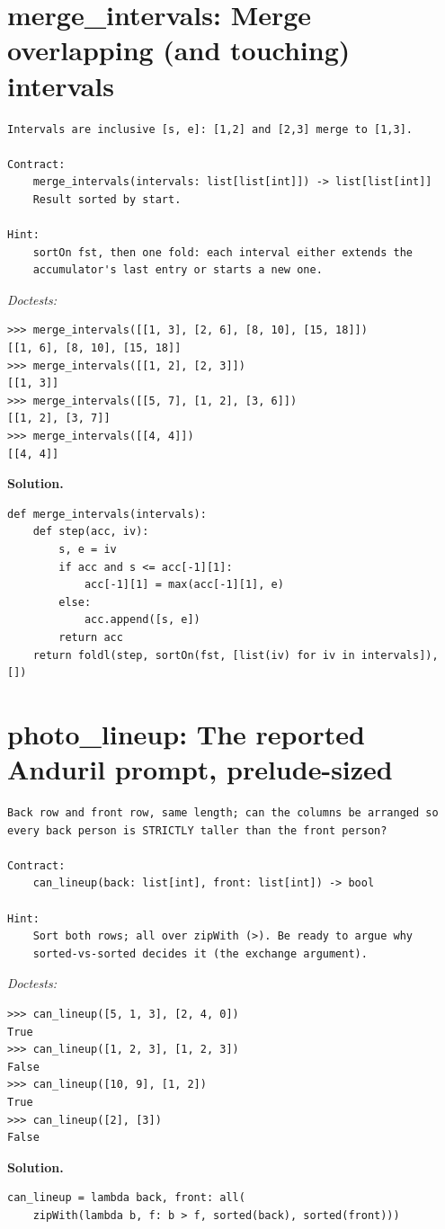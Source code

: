 \documentclass[11pt,letterpaper]{book}
\begin{document}
\section{merge\_intervals: Merge overlapping (and touching) intervals}
\begin{lstlisting}[style=spec]
Intervals are inclusive [s, e]: [1,2] and [2,3] merge to [1,3].

Contract:
    merge_intervals(intervals: list[list[int]]) -> list[list[int]]
    Result sorted by start.

Hint:
    sortOn fst, then one fold: each interval either extends the
    accumulator's last entry or starts a new one.
\end{lstlisting}
\noindent\textit{Doctests:}
\begin{lstlisting}[style=spec]
>>> merge_intervals([[1, 3], [2, 6], [8, 10], [15, 18]])
[[1, 6], [8, 10], [15, 18]]
>>> merge_intervals([[1, 2], [2, 3]])
[[1, 3]]
>>> merge_intervals([[5, 7], [1, 2], [3, 6]])
[[1, 2], [3, 7]]
>>> merge_intervals([[4, 4]])
[[4, 4]]
\end{lstlisting}
\noindent\textbf{Solution.}
\begin{lstlisting}[style=code]
def merge_intervals(intervals):
    def step(acc, iv):
        s, e = iv
        if acc and s <= acc[-1][1]:
            acc[-1][1] = max(acc[-1][1], e)
        else:
            acc.append([s, e])
        return acc
    return foldl(step, sortOn(fst, [list(iv) for iv in intervals]), [])
\end{lstlisting}

\section{photo\_lineup: The reported Anduril prompt, prelude-sized}
\begin{lstlisting}[style=spec]
Back row and front row, same length; can the columns be arranged so
every back person is STRICTLY taller than the front person?

Contract:
    can_lineup(back: list[int], front: list[int]) -> bool

Hint:
    Sort both rows; all over zipWith (>). Be ready to argue why
    sorted-vs-sorted decides it (the exchange argument).
\end{lstlisting}
\noindent\textit{Doctests:}
\begin{lstlisting}[style=spec]
>>> can_lineup([5, 1, 3], [2, 4, 0])
True
>>> can_lineup([1, 2, 3], [1, 2, 3])
False
>>> can_lineup([10, 9], [1, 2])
True
>>> can_lineup([2], [3])
False
\end{lstlisting}
\noindent\textbf{Solution.}
\begin{lstlisting}[style=code]
can_lineup = lambda back, front: all(
    zipWith(lambda b, f: b > f, sorted(back), sorted(front)))
\end{lstlisting}
\end{document}
